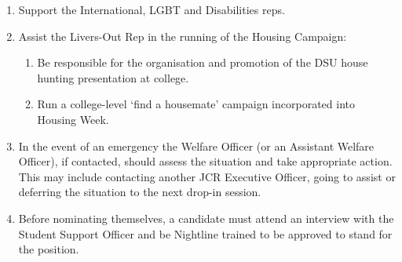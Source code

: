 \begin{enumerate}
    \item Support the International, LGBT and Disabilities reps.
    \item Assist the Livers-Out Rep in the running of the Housing Campaign:
        \begin{enumerate}
            \item Be responsible for the organisation and promotion of the DSU house hunting presentation at college.
            \item Run a college-level ‘find a housemate’ campaign incorporated into Housing Week.
        \end{enumerate}
    \item In the event of an emergency the Welfare Officer (or an Assistant Welfare Officer), if contacted, should assess the situation and take appropriate action. This may include contacting another JCR Executive Officer, going to assist or deferring the situation to the next drop-in session. 
    \item Before nominating themselves, a candidate must attend an interview with the Student Support Officer and be Nightline trained to be approved to stand for the position.
\end{enumerate}


